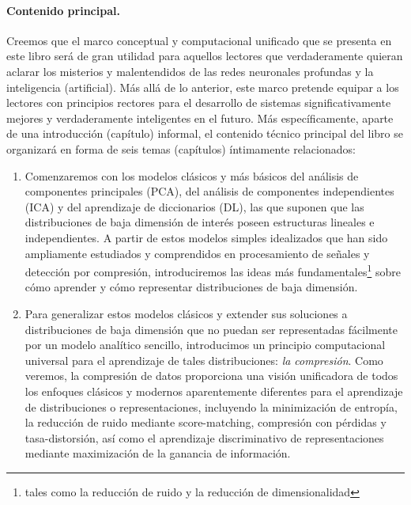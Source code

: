 \documentclass[../../book-main.tex]{subfiles}
\begin{document}
\paragraph{Contenido principal.}
Creemos que el marco conceptual y computacional unificado que se
presenta en este libro será de gran utilidad para aquellos lectores
que verdaderamente quieran aclarar los misterios y malentendidos
de las redes neuronales profundas y la inteligencia (artificial).
Más allá de lo anterior, este marco pretende equipar a los lectores 
con principios rectores para el desarrollo de sistemas significativamente
mejores y verdaderamente inteligentes en el futuro. Más específicamente,
aparte de una introducción (capítulo) informal, el contenido técnico
principal del libro se organizará en forma de seis temas (capítulos)
íntimamente relacionados:
\begin{enumerate}
    \item Comenzaremos con los modelos clásicos y más básicos del
        análisis de componentes principales (PCA), del análisis de
        componentes independientes (ICA) y del aprendizaje de 
        diccionarios (DL), las que suponen que las distribuciones
        de baja dimensión de interés poseen estructuras
        lineales e independientes. A partir de estos modelos simples
        idealizados que han sido ampliamente estudiados y comprendidos
        en procesamiento de señales y detección por compresión, 
        introduciremos las ideas más fundamentales\footnote{tales 
        como la reducción de ruido y la reducción de dimensionalidad} sobre
        cómo aprender y cómo representar distribuciones de baja
        dimensión.

    \item Para generalizar estos modelos clásicos y extender
        sus soluciones a distribuciones de baja dimensión que no
        puedan ser representadas fácilmente por un modelo analítico
        sencillo, introducimos un principio computacional universal para
        el aprendizaje de tales distribuciones: {\em la compresión}.
        Como veremos, la compresión de datos proporciona una visión 
        unificadora de todos los enfoques clásicos y modernos aparentemente
        diferentes para el aprendizaje de distribuciones o representaciones,
        incluyendo la minimización de entropía, la reducción de ruido mediante
        score-matching, compresión con pérdidas y tasa-distorsión, 
        así como el aprendizaje discriminativo de representaciones
        mediante maximización de la ganancia de información.


\end{enumerate}
\end{document}
